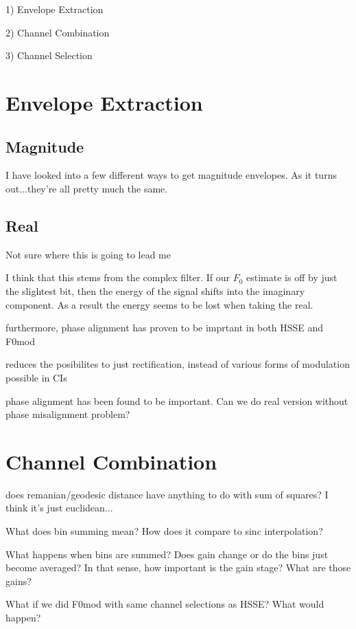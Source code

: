 \documentclass [11pt, proquest] {uwthesis}[2015/03/03]
\begin{document}
1) Envelope Extraction

2) Channel Combination

3) Channel Selection

\section{Envelope Extraction}

\subsection{Magnitude}

I have looked into a few different ways to get magnitude envelopes.  As it turns out...they're all pretty much the same.

\subsection{Real}

Not sure where this is going to lead me

I think that this stems from the complex filter.  If our $F_0$ estimate is off by just the slightest bit, then the energy of the signal shifts into the imaginary component.  As a result the energy seems to be lost when taking the real.

furthermore, phase alignment has proven to be imprtant in both HSSE and F0mod

reduces the posibilites to just rectification, instead of various forms of modulation possible in CIs

phase alignment has been found to be important.  Can we do real version without phase misalignment problem?

\section{Channel Combination}

does remanian/geodesic distance have anything to do with sum of squares?  I think it's just euclidean...

What does bin summing mean?  How does it compare to sinc interpolation?

What happens when bins are summed?  Does gain change or do the bins just become averaged?  In that sense, how important is the gain stage?  What are those gains?

What if we did F0mod with same channel selections as HSSE?  What would happen?
\end{document}

